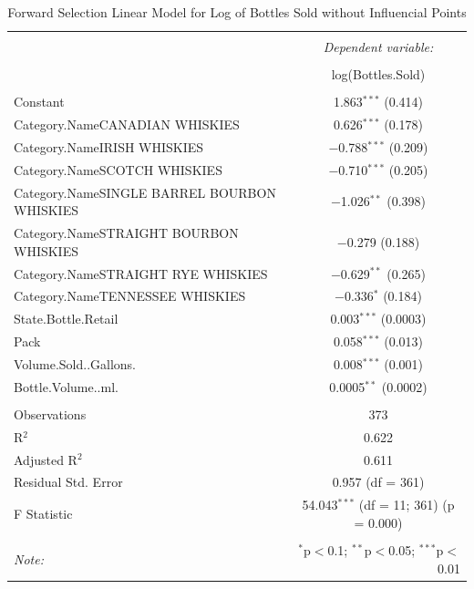 \documentclass[]{elsarticle} %
\begin{document}
\begin{table}[!htbp] \centering 
  \caption{Forward Selection Linear Model for Log of Bottles Sold without Influencial Points} 
  \label{} 
\normalsize 
\begin{tabular}{@{\extracolsep{5pt}}lc} 
\\[-1.8ex]\hline 
\hline \\[-1.8ex] 
 & \multicolumn{1}{c}{\textit{Dependent variable:}} \\ 
\cline{2-2} 
\\[-1.8ex] & log(Bottles.Sold) \\ 
\hline \\[-1.8ex] 
 Constant & 1.863$^{***}$ (0.414) \\ 
  Category.NameCANADIAN WHISKIES & 0.626$^{***}$ (0.178) \\ 
  Category.NameIRISH WHISKIES & $-$0.788$^{***}$ (0.209) \\ 
  Category.NameSCOTCH WHISKIES & $-$0.710$^{***}$ (0.205) \\ 
  Category.NameSINGLE BARREL BOURBON WHISKIES & $-$1.026$^{**}$ (0.398) \\ 
  Category.NameSTRAIGHT BOURBON WHISKIES & $-$0.279 (0.188) \\ 
  Category.NameSTRAIGHT RYE WHISKIES & $-$0.629$^{**}$ (0.265) \\ 
  Category.NameTENNESSEE WHISKIES & $-$0.336$^{*}$ (0.184) \\ 
  State.Bottle.Retail & 0.003$^{***}$ (0.0003) \\ 
  Pack & 0.058$^{***}$ (0.013) \\ 
  Volume.Sold..Gallons. & 0.008$^{***}$ (0.001) \\ 
  Bottle.Volume..ml. & 0.0005$^{**}$ (0.0002) \\ 
 \hline \\[-1.8ex] 
Observations & 373 \\ 
R$^{2}$ & 0.622 \\ 
Adjusted R$^{2}$ & 0.611 \\ 
Residual Std. Error & 0.957 (df = 361) \\ 
F Statistic & 54.043$^{***}$ (df = 11; 361)  (p = 0.000) \\ 
\hline 
\hline \\[-1.8ex] 
\textit{Note:}  & \multicolumn{1}{r}{$^{*}$p$<$0.1; $^{**}$p$<$0.05; $^{***}$p$<$0.01} \\ 
\end{tabular} 
\end{table}
\end{document}
